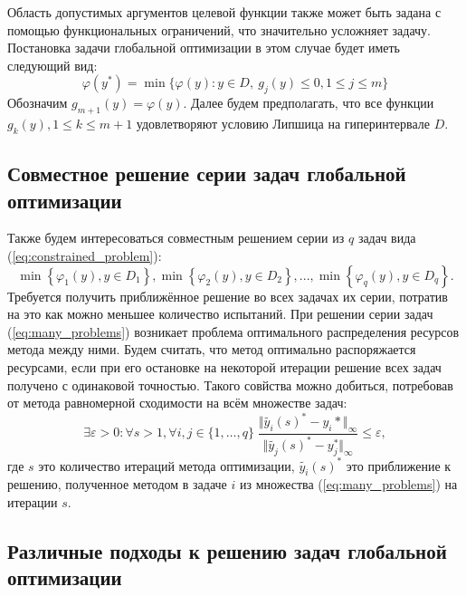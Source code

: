Область допустимых аргументов целевой функции также может быть задана с помощью функциональных ограничений, что
значительно усложняет задачу.
Постановка задачи глобальной оптимизации в этом случае будет иметь следующий вид:
\begin{equation}
  \label{eq:constrained_problem}
  \varphi(y^*)=\min\{\varphi(y):y\in D,\: g_j(y)\leqslant 0, 1\leqslant j\leqslant m\}
\end{equation}
Обозначим \(g_{m+1}(y)=\varphi(y)\). Далее будем предполагать, что все функции \(g_k(y),1\leqslant k \leqslant m+1\)
удовлетворяют условию Липшица на гиперинтервале \(D\).

\subsection{Совместное решение серии задач глобальной оптимизации}

Также будем интересоваться совместным решением серии из \(q\) задач вида (\ref{eq:constrained_problem}):
\begin{equation}
  \label{eq:many_problems}
  \min\left\{\varphi_1(y), y\in D_1 \right\}, \min\left\{\varphi_2(y), y\in D_2\right\},..., \min\left\{\varphi_q(y), y\in D_q\right\}.
\end{equation}
Требуется получить приближённое решение во всех задачах их серии, потратив на это как можно меньшее количество испытаний.
При решении серии задач (\ref{eq:many_problems}) возникает проблема оптимального распределения ресурсов метода между ними.
Будем считать, что метод оптимально распоряжается ресурсами, если при его остановке на некоторой итерации
решение всех задач получено с одинаковой точностью. Такого совйства можно добиться, потребовав
от метода равномерной сходимости на всём множестве задач:
\begin{equation}
  \label{eq:uni_conv}
  \exists \varepsilon > 0: \forall s>1, \forall i,j\in\{1,\dots,q\}\;
    \frac{\Vert \tilde{y_i}(s)^* - y_i*\Vert_\infty}{\Vert \tilde{y_j}(s)^* - y^*_j\Vert_	\infty} \leqslant \varepsilon,
\end{equation}
где \(s\) это количество итераций метода оптимизации, \(\tilde{y_i}(s)^*\) это приближение к решению, полученное методом в задаче \(i\)
из множества (\ref{eq:many_problems}) на итерации \(s\).

\subsection{Различные подходы к решению задач глобальной оптимизации}

